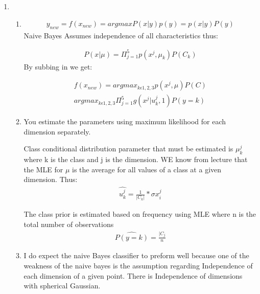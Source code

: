 \documentclass{article}
\begin{document}
	\maketitle
	
	\begin{enumerate}
		
		\item 
		
		\begin{enumerate}
			
			\item 
			\begin{align*}
			y_{new} = f(x_{new}) = arg maxP(x|y)p(y) = p(x|y)P(y)
			\end{align*}
			Naive Bayes Assumes independence of all characteristics thus: 
			
			\begin{align*}
			P(x|\mu)= \Pi_{j=1}^{5}p(x^{j},\mu_{k})P(C_{k})
			\end{align*}
			By subbing in we get:
			
			\begin{align*}
			f(x_{new})=arg max_{k \epsilon {1,2,3}} p(x^{j},\mu)P(C) \\
			arg max_{k \epsilon {1,2,3}} \Pi_{j=1}^{5}g(x^{j}|u_{k}^{j},1)P(y=k)
			\end{align*}
			
			\item	You estimate the parameters using maximum likelihood for each dimension separately. \newline
			
			Class conditional distribution parameter that must be estimated is $\mu_{k}^{j}$ where k is the class and j is the dimension. WE know from lecture that the MLE for $\mu$ is the average for all values of a class at a given dimension. Thus: \newline
			\begin{align*}
			\hat{u_{k}^{j}}=\frac{1}{|C_{k}|}*\sigma{x_{i}^{j}}
			\end{align*}
			

			The class prior is estimated based on frequency using MLE where n is the total number of observations \newline
			\begin{align*}
			\hat{P(y=k)}=\frac{|C_{j}}{n}
			\end{align*}
			

			
			\item I do expect the naive Bayes classifier to preform well because one of the weakness of the naive bayes is the assumption regarding Independence of each dimension of a given point. There is Independence of dimensions with spherical Gaussian.  
			

\end{enumerate}
\end{enumerate}
\end{document}
